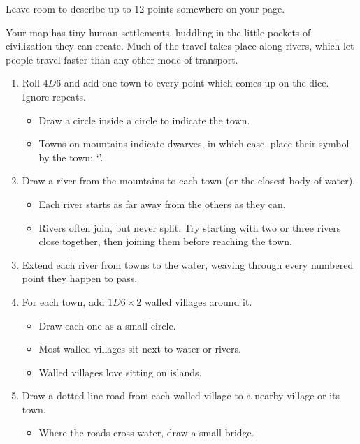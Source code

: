 \begin{multicols}{2}
Leave room to describe up to 12 points somewhere on your page.


Your map has tiny human settlements, huddling in the little pockets of civilization they can create.
Much of the travel takes place along rivers, which let people travel faster than any other mode of transport.

\begin{enumerate}
\item
  Roll $4D6$ and add one town to every point which comes up on the dice.
  Ignore repeats.

  \begin{itemize}
  \item
    Draw a circle inside a circle to indicate the town.
  \item
    Towns on mountains indicate dwarves, in which case, place their symbol by the town: `\Dw'.
  \end{itemize}
  \item
  Draw a river from the mountains to each town (or the closest body of water).
  \begin{itemize}
  \item
    Each river starts as far away from the others as they can.
  \item
    Rivers often join, but never split.
    Try starting with two or three rivers close together, then joining them before reaching the town.
  \end{itemize}
  \item
  Extend each river from towns to the water, weaving through every numbered point they happen to pass.
  \item
  For each town, add $1D6 \times 2$ walled villages around it.
  \begin{itemize}
    \item
    Draw each one as a small circle.
    \item
    Most walled villages sit next to water or rivers.
    \item
    Walled villages love sitting on islands.
  \end{itemize}
  \item
  Draw a dotted-line road from each walled village to a nearby village or its town.
  \begin{itemize}
    \item
    Where the roads cross water, draw a small bridge.
  \end{itemize}
\end{enumerate}


\end{multicols}
